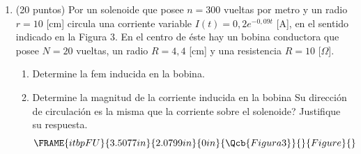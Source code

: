 \documentclass{article}
\begin{document}
\begin{enumerate}
\item (20 puntos) Por un solenoide que posee $n=300$ vueltas por metro y un
radio $r=10$ [cm] circula una corriente variable $I(t)=0,2e^{-0,09t}$ [A],
en el sentido indicado en la Figura 3. En el centro de \'{e}ste hay un
bobina conductora que posee $N=20$ vueltas, un radio $R=4,4$ [cm] y una
resistencia $R=10$ [$\Omega $].

\begin{enumerate}
\item Determine la fem inducida en la bobina.

\item Determine la magnitud de la corriente inducida en la bobina 
\textquestiondown Su direcci\'{o}n de circulaci\'{o}n es la misma que la
corriente sobre el solenoide? Justifique su respuesta.%
\begin{equation*}
\FRAME{itbpFU}{3.5077in}{2.0799in}{0in}{\Qcb{Figura 3}}{}{Figure}{\special%
{language "Scientific Word";type "GRAPHIC";maintain-aspect-ratio
TRUE;display "USEDEF";valid_file "T";width 3.5077in;height 2.0799in;depth
0in;original-width 6.4913in;original-height 3.8337in;cropleft "0";croptop
"1";cropright "1";cropbottom "0";tempfilename
'QWLO9Y00.wmf';tempfile-properties "XPR";}}
\end{equation*}
\end{enumerate}
\end{enumerate}
\end{document}
